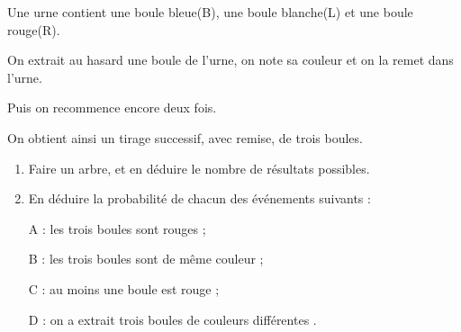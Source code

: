 \exo

Une urne contient une boule bleue(B), une boule blanche(L) et une boule rouge(R).

On extrait au hasard une boule de l'urne, on note sa couleur et on la remet dans l'urne.

Puis on recommence encore deux fois.

On obtient ainsi un tirage successif, avec remise, de trois boules.

\begin{enumerate}
\item Faire un arbre, et en déduire le nombre de résultats possibles.

\item  En déduire la probabilité de chacun des événements suivants :

A : \og les trois boules sont rouges \fg ;

B : \og les trois boules sont de même couleur \fg{};

C : \og au moins une boule est rouge \fg{} ;

D : \og on a extrait trois boules de couleurs différentes \fg{}.

\end{enumerate}

